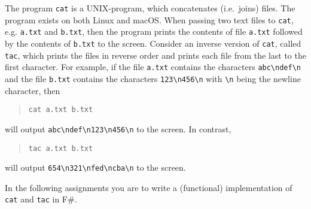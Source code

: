 The program \lstinline[language=console]{cat} is a UNIX-program, which concatenates (i.e.\ joins) files. The program exists on both Linux and macOS. When passing two text files to \lstinline[language=console]{cat}, e.g. \lstinline[language=console]{a.txt} and \lstinline[language=console]{b.txt}, then the program prints the contents of file \lstinline[language=console]{a.txt} followed by the contents of \lstinline[language=console]{b.txt} to the screen. Consider an inverse version of \texttt{cat}, called \texttt{tac}, which prints the files in reverse order and prints each file from the last to the first character. For example, if the file \lstinline[language=console]{a.txt} contains the characters \lstinline[language=console]{abc\ndef\n} and the file \lstinline[language=console]{b.txt} contains the characters \lstinline[language=console]{123\n456\n} with \lstinline[language=console]{\n} being the newline character, then
\begin{quote}
\lstinline[language=console]{cat a.txt b.txt}
\end{quote}
will output \lstinline[language=console]{abc\ndef\n123\n456\n} to the screen. In contrast,
\begin{quote}
\lstinline[language=console]{tac a.txt b.txt}
\end{quote}
will output \lstinline[language=console]{654\n321\nfed\ncba\n} to the screen.

In the following assignments you are to write a (functional) implementation of \lstinline[language=console]{cat} and \lstinline[language=console]{tac} in F\#.
